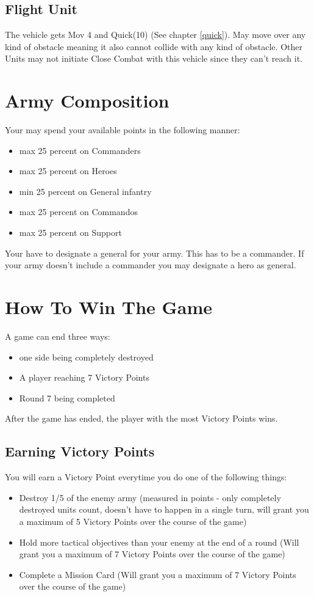 \documentclass[
	11pt,
	toc=bibliography
	]{article}
\begin{document}
\subsection{Flight Unit}
The vehicle gets Mov 4 and Quick(10) (See chapter \ref{quick}). May move over any kind of obstacle meaning it also cannot collide with any kind of obstacle. Other Units may not initiate Close Combat with this vehicle since they can't reach it.

\newpage
\section{Army Composition}\label{armyComposition}
Your may spend your available points in the following manner:
\begin{itemize}
\item max 25 percent on Commanders
\item max 25 percent on Heroes
\item min 25 percent on General infantry
\item max 25 percent on Commandos
\item max 25 percent on Support
\end{itemize}

Your have to designate a general for your army. This has to be a commander. If your army doesn't include a commander you may designate a hero as general.

\section{How To Win The Game}\label{howToWin}
A game can end three ways:
\begin{itemize}
\item one side being completely destroyed
\item A player reaching 7 Victory Points
\item Round 7 being completed
\end{itemize}

After the game has ended, the player with the most Victory Points wins.

\subsection{Earning Victory Points}
You will earn a Victory Point everytime you do one of the following things:
\begin{itemize}
\item Destroy 1/5 of the enemy army (measured in points - only completely destroyed units count, doesn't have to happen in a single turn, will grant you a maximum of 5 Victory Points over the course of the game)
\item Hold more tactical objectives than your enemy at the end of a round (Will grant you a maximum of 7 Victory Points over the course of the game)
\item Complete a Mission Card (Will grant you a maximum of 7 Victory Points over the course of the game)
\end{itemize}
\end{document}

